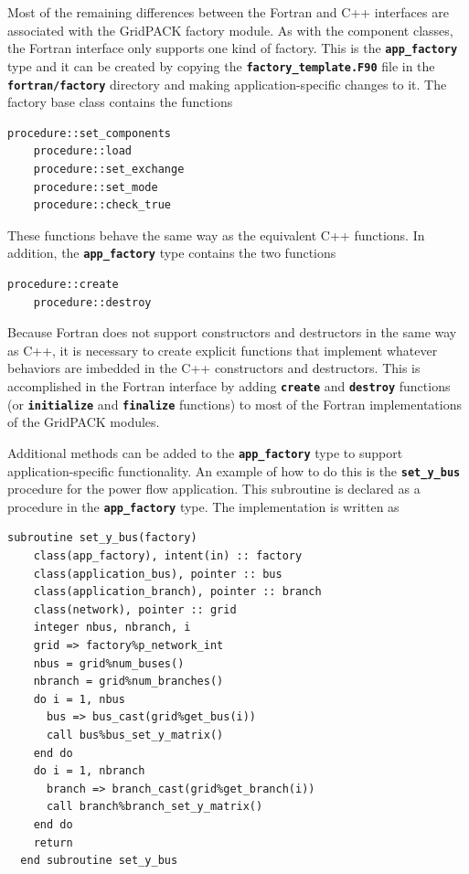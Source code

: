 \documentclass[12pt]{report} %
\begin{document}
Most of the remaining differences between the Fortran and C++ interfaces are associated with the GridPACK factory module. As with the component classes, the Fortran interface only supports one kind of factory. This is the \texttt{\textbf{app\_factory}} type and it can be created by copying the \texttt{\textbf{factory\_template.F90}} file in the \texttt{\textbf{fortran/factory}} directory and making application-specific changes to it. The factory base class contains the functions

{
\color{red}
\begin{Verbatim}[fontseries=b]
    procedure::set_components
    procedure::load
    procedure::set_exchange
    procedure::set_mode
    procedure::check_true
\end{Verbatim}
}

These functions behave the same way as the equivalent C++ functions. In addition, the \texttt{\textbf{app\_factory}} type contains the two functions

{
\color{red}
\begin{Verbatim}[fontseries=b]
    procedure::create
    procedure::destroy
\end{Verbatim}
}

Because Fortran does not support constructors and destructors in the same way as C++, it is necessary to create explicit functions that implement whatever behaviors are imbedded in the C++ constructors and destructors. This is accomplished in the Fortran interface by adding \texttt{\textbf{create}} and \texttt{\textbf{destroy}} functions (or \texttt{\textbf{initialize}} and \texttt{\textbf{finalize}} functions) to most of the Fortran implementations of the GridPACK modules.

Additional methods can be added to the \texttt{\textbf{app\_factory}} type to support application-specific functionality. An example of how to do this is the \texttt{\textbf{set\_y\_bus}} procedure for the power flow application. This subroutine is declared as a procedure in the \texttt{\textbf{app\_factory}} type. The implementation is written as

{
\color{red}
\begin{Verbatim}[fontseries=b]
  subroutine set_y_bus(factory)
    class(app_factory), intent(in) :: factory
    class(application_bus), pointer :: bus
    class(application_branch), pointer :: branch
    class(network), pointer :: grid
    integer nbus, nbranch, i
    grid => factory%p_network_int
    nbus = grid%num_buses()
    nbranch = grid%num_branches()
    do i = 1, nbus
      bus => bus_cast(grid%get_bus(i))
      call bus%bus_set_y_matrix()
    end do
    do i = 1, nbranch
      branch => branch_cast(grid%get_branch(i))
      call branch%branch_set_y_matrix()
    end do
    return
  end subroutine set_y_bus
\end{Verbatim}
}
\end{document}
